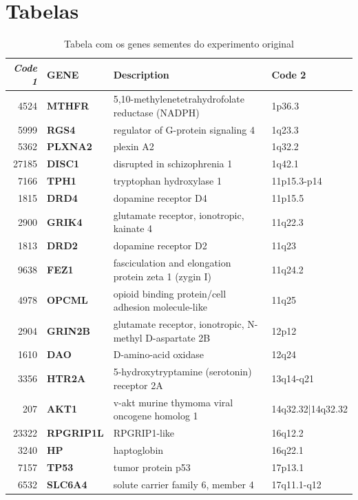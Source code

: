 
\captionsbrazil
\chapter{Tabelas}
\label{appendice_tables}

\begin{table}[]
\centering
\tiny
\caption{Tabela com os genes sementes do experimento original}
\label{table_original_seeds}
\begin{tabular}{@{}rlll@{}}
\toprule
\textbf{\textsl{Code 1}} & \textbf{GENE} &   \textbf{Description} & \textbf{Code 2} \\ \midrule
4524 & \textbf{MTHFR} & 5,10-methylenetetrahydrofolate reductase (NADPH) & 1p36.3 \\
5999 & \textbf{RGS4} & regulator of G-protein signaling 4 & 1q23.3 \\
5362 & \textbf{PLXNA2} & plexin A2 & 1q32.2 \\
27185 & \textbf{DISC1} & disrupted in schizophrenia 1 & 1q42.1 \\
7166 & \textbf{TPH1} & tryptophan hydroxylase 1 & 11p15.3-p14 \\
1815 & \textbf{DRD4} & dopamine receptor D4 & 11p15.5 \\
2900 & \textbf{GRIK4} & glutamate receptor, ionotropic, kainate 4 & 11q22.3 \\
1813 & \textbf{DRD2} & dopamine receptor D2 & 11q23 \\
9638 & \textbf{FEZ1} & fasciculation and elongation protein zeta 1 (zygin I) & 11q24.2 \\
4978 & \textbf{OPCML} & opioid binding protein/cell adhesion molecule-like & 11q25 \\
2904 & \textbf{GRIN2B} & glutamate receptor, ionotropic, N-methyl D-aspartate 2B & 12p12 \\
1610 & \textbf{DAO} & D-amino-acid oxidase & 12q24 \\
3356 & \textbf{HTR2A} & 5-hydroxytryptamine (serotonin) receptor 2A & 13q14-q21 \\
207 & \textbf{AKT1} & v-akt murine thymoma viral oncogene homolog 1 & 14q32.32|14q32.32 \\
23322 & \textbf{RPGRIP1L} & RPGRIP1-like & 16q12.2 \\
3240 & \textbf{HP} & haptoglobin & 16q22.1 \\
7157 & \textbf{TP53} & tumor protein p53 & 17p13.1 \\
6532 & \textbf{SLC6A4} & solute carrier family 6, member 4 & 17q11.1-q12 \\

\end{tabular}
\end{table}
